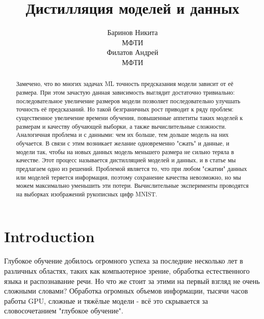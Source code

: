 \documentclass[12pt]{article}
\title{Дистилляция моделей и данных}
\author{ Баринов Никита\\
	МФТИ\\
	\And
	Филатов Андрей \\
	МФТИ       
}
\date{}
\begin{document}
\maketitle

\begin{abstract}


    Замечено, что во многих задачах ML точность предсказания модели зависит от её размера. При этом зачастую данная зависимость выглядит достаточно тривиально: последовательное увеличение размеров модели позволяет последовательно улучшать точность её предсказаний. Но такой безграничных рост приводит к ряду проблем: существенное увеличение времени обучения, повышенные аппетиты таких моделей к размерам и качеству обучающей выборки, а также вычислительные сложности. Аналогичная проблема и с данными: чем их больше, тем дольше модель на них обучается.
    В связи с этим возникает желание одновременно "сжать" и данные, и модели так, чтобы на новых данных модель меньшего размера не сильно теряла в качестве. Этот процесс называется дистилляцией моделей и данных, и в статье мы предлагаем одно из решений. Проблемой является то, что при любом "сжатии" данных или моделей теряется информация, поэтому сохранение качества невозможно, но мы можем максимально уменьшить эти потери. Вычислительные эксперименты проводятся на выборках изображений рукописных цифр MNIST. 


\end{abstract}



\section{Introduction}

Глубокое обучение добилось огромного успеха за последние несколько лет в различных областях, таких как компьютерное зрение, обработка естественного языка и распознавание речи. Но что же стоит за этими на первый взгляд не очень сложными словами? Обработка огромных объемов информации, тысячи часов работы GPU, сложные и тяжёлые модели - всё это скрывается за словосочетанием "глубокое обучение". 
\end{document}
